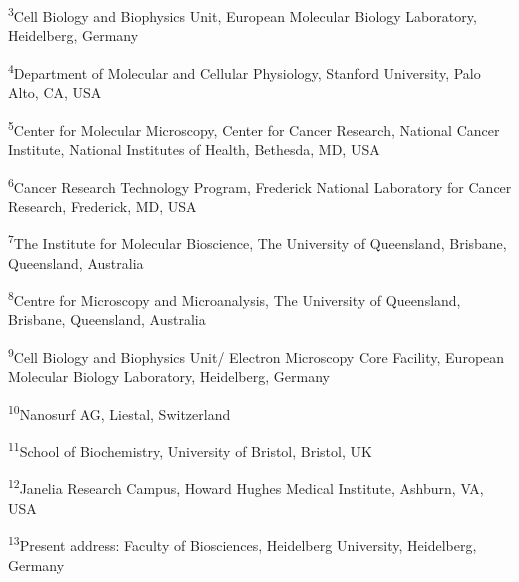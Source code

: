 \documentclass{article}
\begin{document}
\noindent\textsuperscript{3}Cell Biology and Biophysics Unit, European Molecular Biology Laboratory, Heidelberg, Germany

\noindent\textsuperscript{4}Department of Molecular and Cellular Physiology, Stanford University, Palo Alto, CA, USA

\noindent\textsuperscript{5}Center for Molecular Microscopy, Center for Cancer Research, National Cancer Institute, National Institutes of Health, Bethesda, MD, USA

\noindent\textsuperscript{6}Cancer Research Technology Program, Frederick National Laboratory for Cancer Research, Frederick, MD, USA

\noindent\textsuperscript{7}The Institute for Molecular Bioscience, The University of Queensland, Brisbane, Queensland, Australia

\noindent\textsuperscript{8}Centre for Microscopy and Microanalysis, The University of Queensland, Brisbane, Queensland, Australia

\noindent\textsuperscript{9}Cell Biology and Biophysics Unit/ Electron Microscopy Core Facility, European Molecular Biology Laboratory, Heidelberg, Germany

\noindent\textsuperscript{10}Nanosurf AG, Liestal, Switzerland

\noindent\textsuperscript{11}School of Biochemistry, University of Bristol, Bristol, UK

\noindent\textsuperscript{12}Janelia Research Campus, Howard Hughes Medical Institute, Ashburn, VA, USA

\noindent\textsuperscript{13}Present address: Faculty of Biosciences, Heidelberg University, Heidelberg, Germany
\end{document}

